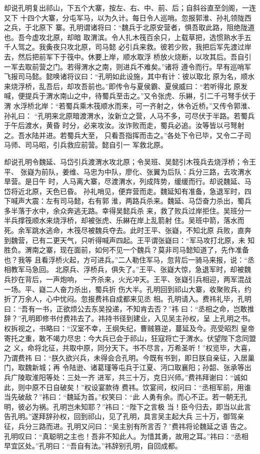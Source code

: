 却说孔明复出祁山，下五个大寨，按左、右、中、前、后；自斜谷直至剑阁，一连又下
十四个大寨，分屯军马，以为久计。每日令人巡哨。忽报郭淮、孙礼领陇西之兵，于北原下
寨。孔明谓诸将曰：“魏兵于北原安营者，惧吾取此路，阻绝陇道也。吾今虚攻北原，却暗
取渭滨。令人扎木筏百余只，上载草把，选惯熟水手五千人驾之。我夤夜只攻北原，司马懿
必引兵来救。彼若少败，我把后军先渡过岸去，然后把前军下于筏中。休要上岸，顺水取浮
桥放火烧断，以攻其后。吾自引一军去取前营之门。若得渭水之南，则进兵不难矣。”诸将
遵令而行。早有巡哨军飞报司马懿。懿唤诸将议曰：“孔明如此设施，其中有计：彼以取北
原为名，顺水来烧浮桥，乱吾后，却攻吾前也。”即传令与夏侯霸、夏侯威曰：“若听得北
原发喊，便提兵于渭水南山之中，待蜀兵至击之。”又令张虎、乐綝，引二千弓弩手伏于渭
水浮桥北岸：“若蜀兵乘木筏顺水而来，可一齐射之，休令近桥。”又传令郭淮、孙礼曰：
“孔明来北原暗渡渭水，汝新立之营，人马不多，可尽伏于半路。若蜀兵于午后渡水，黄昏
时分，必来攻汝。汝诈败而走，蜀兵必追。汝等皆以弓弩射之。吾水陆并进。若蜀兵大至，
只看吾指挥而击之。”各处下令已毕，又令二子司马师、司马昭，引兵救应前营。懿自引一
军救北原。

却说孔明令魏延、马岱引兵渡渭水攻北原；令吴班、吴懿引木筏兵去烧浮桥；令王平、
张嶷为前队，姜维、马忠为中队，廖化、张翼为后队：兵分三路，去攻渭水旱营。是日午
时，人马离大寨，尽渡渭水，列成阵势，缓缓而行。却说魏延、马岱将近北原，天色已昏。
孙礼哨见，便弃营而走。魏延知有准备，急退军时，四下喊声大震：左有司马懿，右有郭
淮，两路兵杀来。魏延、马岱奋力杀出，蜀兵多半落于水中，余众奔逃无路。幸得吴懿兵杀
来，救了败兵过岸拒住。吴班分一半兵撑筏顺水来烧浮桥，却被张虎、乐綝在岸上乱箭射
住。吴班中箭，落水而死。余军跳水逃命，木筏尽被魏兵夺去。此时王平、张嶷，不知北原
兵败，直奔到魏营，已有二更天气，只听得喊声四起。王平谓张嶷曰：“军马攻打北原，未
知胜负。渭南之寨，现在面前，如何不见一个魏兵？莫非司马懿知道了，先作准备也？我等
且看浮桥火起，方可进兵。”二人勒住军马，忽背后一骑马来报，说：“丞相教军马急回。
北原兵、浮桥兵，俱失了。”王平、张嶷大惊，急退军时，却被魏兵抄在背后，一声炮响，
一齐杀来，火光冲天。王平、张嶷引兵相迎，两军混战一场。平、嶷二人奋力杀出，蜀兵折
伤大半。孔明回到祁山大寨，收聚败兵，约折了万余人，心中忧闷。忽报费祎自成都来见丞
相。孔明请入。费祎礼毕，孔明曰：“吾有一书，正欲烦公去东吴投递，不知肯去否？”祎
曰：“丞相之命，岂敢推辞？”孔明即修书付费祎去了。祎持书径到建业，入见吴主孙权，呈
上孔明之书。权拆视之，书略曰：“汉室不幸，王纲失纪，曹贼篡逆，蔓延及今。亮受昭烈
皇帝寄托之重，敢不竭力尽忠：今大兵已会于祁山，狂寇将亡于渭水。伏望陛下念同盟之
义，命将北征，共取中原，同分天下。书不尽言，万希圣听！”权览毕，大喜，乃谓费祎
曰：“朕久欲兴兵，未得会合孔明。今既有书到，即日朕自亲征，入居巢门，取魏新城；再
令陆逊、诸葛瑾等屯兵于江夏、沔口取襄阳；孙韶、张承等出兵广陵取淮阳等处：三处一齐
进军，共三十万，克日兴师。”费祎拜谢曰：“诚如此，则中原不日自破矣！”权设宴款待
费祎。饮宴间，权问曰：“丞相军前，用谁当先破敌？”祎曰：“魏延为首。”权笑曰：“此
人勇有余。而心不正。若一朝无孔明，彼必为祸。孔明岂未知耶？”祎曰：“陛下之言极
当！臣今归去，即当以此言告孔明。”遂拜辞孙权，回到祁山，见了孔明，具言吴主起大兵
三十万，御驾亲征，兵分三路而进。孔明又问曰：“吴主别有所言否？”费祎将论魏延之语
告之。孔明叹曰：“真聪明之主也！吾非不知此人。为惜其勇，故用之耳。”祎曰：“丞相
早宜区处。”孔明曰：“吾自有法。”祎辞别孔明，自回成都。

